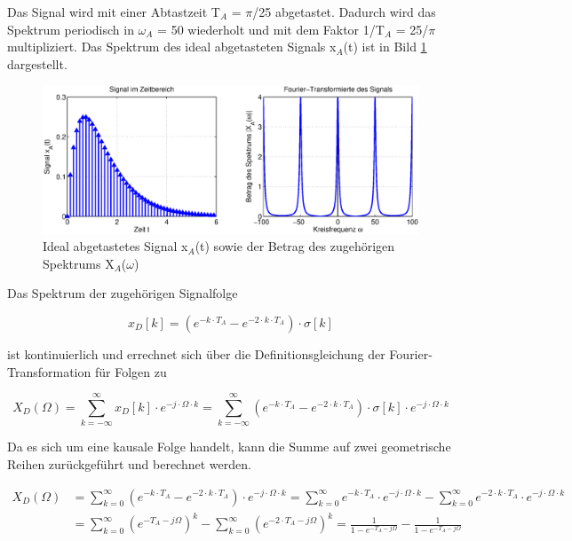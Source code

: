 \noindent Das Signal wird mit einer Abtastzeit T${}_{A}$ = $\pi$/25 abgetastet. Dadurch wird das Spektrum periodisch in $\omega_{A}$ = 50 wiederholt und mit dem Faktor 1/T${}_{A}$ = 25/$\pi$ multipliziert. Das Spektrum des ideal abgetasteten Signals x${}_{A}$(t) ist in Bild \ref{fig:VergleichSpektrumSignaleFolgen2} dargestellt.

\begin{figure}[H]
  \centerline{\includegraphics[width=1\textwidth]{Kapitel7/Bilder/image16.eps}}
  \caption{Ideal abgetastetes Signal x${}_{A}$(t) sowie der Betrag des zugeh\"{o}rigen Spektrums {\textbar}X${}_{A}$($\omega$){\textbar}}
  \label{fig:VergleichSpektrumSignaleFolgen2}
\end{figure}

\noindent Das Spektrum der zugeh\"{o}rigen Signalfolge 

\begin{equation}\label{eq:sevenonehundredone}
x_{D} \left[k\right]=\left(e^{-k\cdot T_{A} } -e^{-2\cdot k\cdot T_{A} } \right)\cdot \sigma \left[k\right]
\end{equation}

\noindent ist kontinuierlich und errechnet sich \"{u}ber die Definitionsgleichung der Fourier-Transformation f\"{u}r Folgen zu

\begin{equation}\label{eq:sevenonehundredtwo}
X_{D} \left(\Omega \right)=\sum _{k=-\infty }^{\infty }x_{D} \left[k\right]\cdot e^{-j\cdot \Omega \cdot k}  =\sum _{k=-\infty }^{\infty }\left(e^{-k\cdot T_{A} } -e^{-2\cdot k\cdot T_{A} } \right)\cdot \sigma \left[k\right]\cdot e^{-j\cdot \Omega \cdot k}
\end{equation}

\noindent Da es sich um eine kausale Folge handelt, kann die Summe auf zwei geometrische Reihen zur\"{u}ckgef\"{u}hrt und berechnet werden.

\begin{equation}\label{eq:sevenonehundredthree}
\begin{split}
X_{D} \left(\Omega \right) &=\sum _{k=0}^{\infty }\left(e^{-k\cdot T_{A} } -e^{-2\cdot k\cdot T_{A} } \right)\cdot e^{-j\cdot \Omega \cdot k}  =\sum _{k=0}^{\infty }e^{-k\cdot T_{A} } \cdot e^{-j\cdot \Omega \cdot k}  -\sum _{k=0}^{\infty }e^{-2\cdot k\cdot T_{A} } \cdot e^{-j\cdot \Omega \cdot k} \\
&=\sum _{k=0}^{\infty }\left(e^{-T_{A}-j\Omega} \right)^{k}-\sum _{k=0}^{\infty }\left(e^{-2\cdot T_{A}-j\Omega} \right)^{k}=\frac{1}{1-e^{-T_{A}-j\Omega}}-\frac{1}{1-e^{-T_{A}-j\Omega}}
\end{split}
\end{equation}

